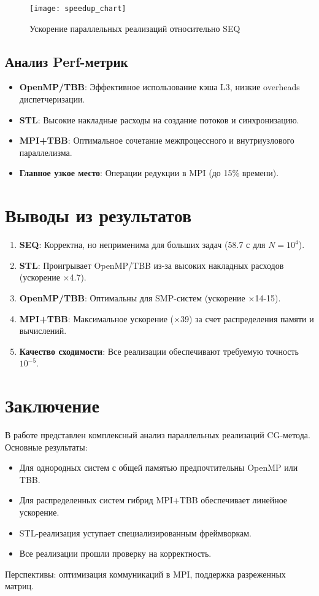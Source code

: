 \documentclass[12pt]{article}
\begin{document}
\begin{figure}[h]
\centering
\texttt{[image: speedup\_chart]}
\caption{Ускорение параллельных реализаций относительно SEQ}
\label{fig:speedup}
\end{figure}

\subsection{Анализ Perf-метрик}

\begin{itemize}
    \item \textbf{OpenMP/TBB}: Эффективное использование кэша L3, низкие overheads диспетчеризации.
    \item \textbf{STL}: Высокие накладные расходы на создание потоков и синхронизацию.
    \item \textbf{MPI+TBB}: Оптимальное сочетание межпроцессного и внутриузлового параллелизма.
    \item \textbf{Главное узкое место}: Операции редукции в MPI (до 15\% времени).
\end{itemize}

\section{Выводы из результатов}

\begin{enumerate}
    \item \textbf{SEQ}: Корректна, но неприменима для больших задач (58.7 с для \(N=10^4\)).
    \item \textbf{STL}: Проигрывает OpenMP/TBB из-за высоких накладных расходов (ускорение ×4.7).
    \item \textbf{OpenMP/TBB}: Оптимальны для SMP-систем (ускорение ×14-15).
    \item \textbf{MPI+TBB}: Максимальное ускорение (×39) за счет распределения памяти и вычислений.
    \item \textbf{Качество сходимости}: Все реализации обеспечивают требуемую точность \(10^{-5}\).
\end{enumerate}

\section{Заключение}

В работе представлен комплексный анализ параллельных реализаций CG-метода. Основные результаты:
\begin{itemize}
    \item Для однородных систем с общей памятью предпочтительны OpenMP или TBB.
    \item Для распределенных систем гибрид MPI+TBB обеспечивает линейное ускорение.
    \item STL-реализация уступает специализированным фреймворкам.
    \item Все реализации прошли проверку на корректность.
\end{itemize}
Перспективы: оптимизация коммуникаций в MPI, поддержка разреженных матриц.
\end{document}
